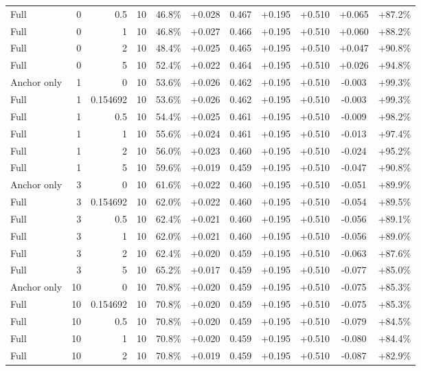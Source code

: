 \begin{table}[htbp]
\begin{tabular}{lrrrccccccc}
Full & 0 & 0.5 & 10 & 46.8\% & +0.028 & 0.467 & +0.195 & +0.510 & +0.065 & +87.2\% \\
Full & 0 & 1 & 10 & 46.8\% & +0.027 & 0.466 & +0.195 & +0.510 & +0.060 & +88.2\% \\
Full & 0 & 2 & 10 & 48.4\% & +0.025 & 0.465 & +0.195 & +0.510 & +0.047 & +90.8\% \\
Full & 0 & 5 & 10 & 52.4\% & +0.022 & 0.464 & +0.195 & +0.510 & +0.026 & +94.8\% \\
Anchor only & 1 & 0 & 10 & 53.6\% & +0.026 & 0.462 & +0.195 & +0.510 & -0.003 & +99.3\% \\
Full & 1 & 0.154692 & 10 & 53.6\% & +0.026 & 0.462 & +0.195 & +0.510 & -0.003 & +99.3\% \\
Full & 1 & 0.5 & 10 & 54.4\% & +0.025 & 0.461 & +0.195 & +0.510 & -0.009 & +98.2\% \\
Full & 1 & 1 & 10 & 55.6\% & +0.024 & 0.461 & +0.195 & +0.510 & -0.013 & +97.4\% \\
Full & 1 & 2 & 10 & 56.0\% & +0.023 & 0.460 & +0.195 & +0.510 & -0.024 & +95.2\% \\
Full & 1 & 5 & 10 & 59.6\% & +0.019 & 0.459 & +0.195 & +0.510 & -0.047 & +90.8\% \\
Anchor only & 3 & 0 & 10 & 61.6\% & +0.022 & 0.460 & +0.195 & +0.510 & -0.051 & +89.9\% \\
Full & 3 & 0.154692 & 10 & 62.0\% & +0.022 & 0.460 & +0.195 & +0.510 & -0.054 & +89.5\% \\
Full & 3 & 0.5 & 10 & 62.4\% & +0.021 & 0.460 & +0.195 & +0.510 & -0.056 & +89.1\% \\
Full & 3 & 1 & 10 & 62.0\% & +0.021 & 0.460 & +0.195 & +0.510 & -0.056 & +89.0\% \\
Full & 3 & 2 & 10 & 62.4\% & +0.020 & 0.459 & +0.195 & +0.510 & -0.063 & +87.6\% \\
Full & 3 & 5 & 10 & 65.2\% & +0.017 & 0.459 & +0.195 & +0.510 & -0.077 & +85.0\% \\
Anchor only & 10 & 0 & 10 & 70.8\% & +0.020 & 0.459 & +0.195 & +0.510 & -0.075 & +85.3\% \\
Full & 10 & 0.154692 & 10 & 70.8\% & +0.020 & 0.459 & +0.195 & +0.510 & -0.075 & +85.3\% \\
Full & 10 & 0.5 & 10 & 70.8\% & +0.020 & 0.459 & +0.195 & +0.510 & -0.079 & +84.5\% \\
Full & 10 & 1 & 10 & 70.8\% & +0.020 & 0.459 & +0.195 & +0.510 & -0.080 & +84.4\% \\
Full & 10 & 2 & 10 & 70.8\% & +0.019 & 0.459 & +0.195 & +0.510 & -0.087 & +82.9\% \\

\end{tabular}
\end{table}
